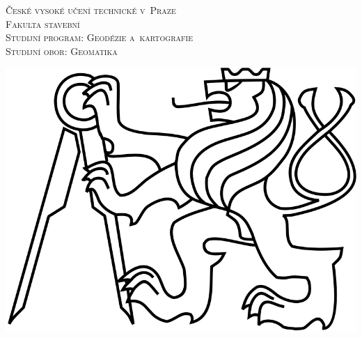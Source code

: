 \documentclass[12pt]{article}
\begin{document}
\begin{titlepage}
\center %
 

\textsc{\LARGE České vysoké učení technické v~Praze}\\[0.5cm] %
\textsc{\Large Fakulta stavební}\\[0.5cm] %
\textsc{\large Studijní program: Geodézie a~kartografie}\\[0.5cm] %
\textsc{\large Studijní obor: Geomatika}\\[0.5cm] %


\vspace{50pt}

\includegraphics[scale=1.2]{images/cvut_logo.png}  %


\vspace{40pt}


\end{titlepage}
\end{document}
